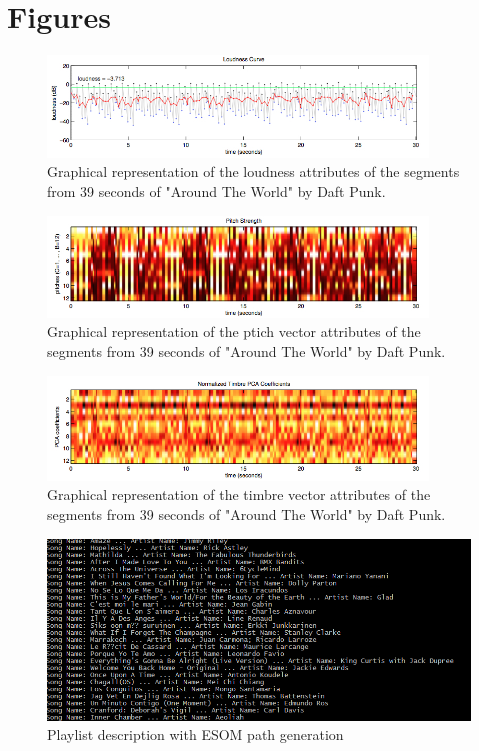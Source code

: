 \section{Figures} %
\label{sec:list_of_figures}


\begin{figure}[h]
    \centering
    \includegraphics[width=0.9\textwidth]{figures/loudness.jpg}
    \caption{Graphical representation of the loudness attributes of the segments from 39 seconds of "Around The World" by Daft Punk.}
    \label{fig:loudness}
\end{figure}

\begin{figure}[h]
    \centering
    \includegraphics[width=0.9\textwidth]{figures/pitch.jpg}
    \caption{Graphical representation of the ptich vector attributes of the segments from 39 seconds of "Around The World" by Daft Punk.}
    \label{fig:pitch}
\end{figure}

\begin{figure}[h]
    \centering
    \includegraphics[width=0.9\textwidth]{figures/timbre.jpg}
    \caption{Graphical representation of the timbre vector attributes of the segments from 39 seconds of "Around The World" by Daft Punk.}
    \label{fig:timbre}
\end{figure}


\begin{figure}[h]
    \centering
    \includegraphics[width=\textwidth]{figures/ESOMSongs.PNG}
    \caption{Playlist description with ESOM path generation}
    \label{fig:esomres}
\end{figure}

